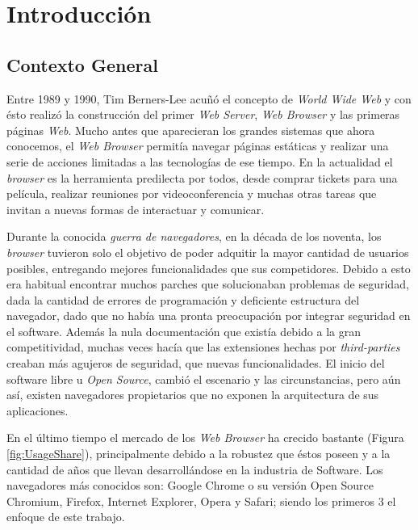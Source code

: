 


\chapter{Introducción}
\label{chap1:intro}


\section{Contexto General}
\label{chap1:CG}

Entre 1989 y 1990, Tim Berners-Lee acuñó el concepto de \textit{World Wide Web} y con ésto realizó la construcción del primer \textit{Web Server}, \textit{Web Browser} y las primeras páginas \textit{Web}. Mucho antes que aparecieran los grandes sistemas que ahora conocemos, el \textit{Web Browser} permitía navegar páginas estáticas y realizar una serie de acciones limitadas a las tecnologías de ese tiempo. En la actualidad el \textit{browser} es la herramienta predilecta por todos, desde comprar tickets para una película, realizar reuniones por videoconferencia y muchas otras tareas que invitan a nuevas formas de interactuar y comunicar.

Durante la conocida \textit{guerra de navegadores}, en la década de los noventa, los \textit{browser} tuvieron solo el objetivo de poder adquitir la mayor cantidad de usuarios posibles, entregando mejores funcionalidades que sus competidores. Debido a esto era habitual encontrar muchos parches que solucionaban problemas de seguridad, dada la cantidad de errores de programación y deficiente estructura del navegador, dado que no había una pronta preocupación por integrar seguridad en el software. Además la nula documentación que existía debido a la gran competitividad, muchas veces hacía que las extensiones hechas por \textit{third-parties} creaban más agujeros de seguridad, que nuevas funcionalidades. El inicio del software libre u \textit{Open Source}, cambió el escenario y las circunstancias, pero aún así, existen navegadores propietarios que no exponen la arquitectura de sus aplicaciones.

En el último tiempo el mercado de los \textit{Web Browser} ha crecido bastante (Figura \ref{fig:UsageShare}), principalmente debido a la robustez que éstos poseen y a la cantidad de años que llevan desarrollándose en la industria de Software. Los navegadores más conocidos son: Google Chrome o su versión Open Source Chromium, Firefox, Internet Explorer, Opera y Safari; siendo los primeros 3 el enfoque de este trabajo.

